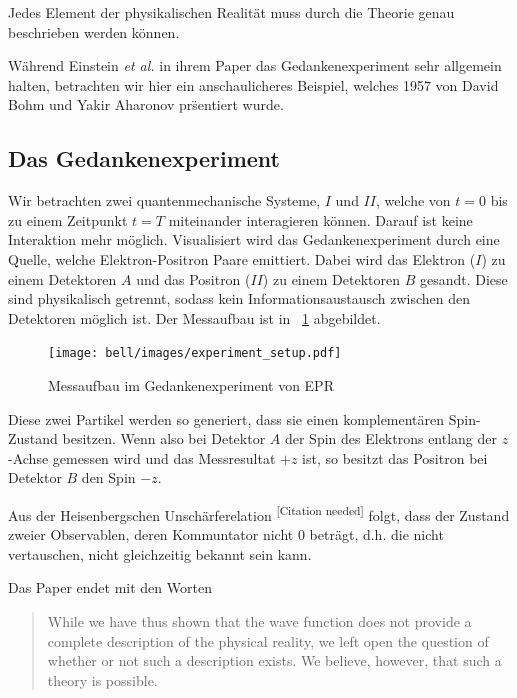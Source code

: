 \begin{refsection}
\begin{definition}\label{def:Bell:Vollstaendigkeit}
    Jedes Element der physikalischen Realit\"at muss durch die Theorie
    genau beschrieben werden k\"onnen.
\end{definition}

Während Einstein \emph{et al.} in ihrem Paper das Gedankenexperiment sehr
allgemein halten, betrachten wir hier ein anschaulicheres Beispiel, welches
1957 von David Bohm und Yakir Aharonov \cite{Bell:Bohm1957} pr\"sentiert wurde.

\subsection{Das Gedankenexperiment}
Wir betrachten zwei quantenmechanische Systeme, $I$ und $II$,
welche von $t=0$ bis zu einem Zeitpunkt $t=T$ miteinander 
interagieren k\"onnen. Darauf ist keine Interaktion mehr m\"oglich.
Visualisiert wird das Gedankenexperiment durch eine Quelle, welche
Elektron-Positron Paare emittiert. 
Dabei wird das Elektron ($I$) zu einem Detektoren $A$ und das 
Positron ($II$) zu einem Detektoren $B$ gesandt.
Diese sind physikalisch getrennt, sodass kein Informationsaustausch
zwischen den Detektoren m\"oglich ist.
Der Messaufbau ist in \figurename~\ref{fig:bell:EPR_Messaufbau} abgebildet.

\begin{figure}
    \centering
    \texttt{[image: bell/images/experiment\_setup.pdf]}
    \caption{Messaufbau im Gedankenexperiment von EPR}
    \label{fig:bell:EPR_Messaufbau}
\end{figure}

Diese zwei Partikel werden so generiert, dass sie einen komplement\"aren
Spin-Zustand besitzen. 
Wenn also bei Detektor $A$ der Spin des Elektrons entlang der $z$-Achse
gemessen wird und das Messresultat $+z$ ist, so besitzt das Positron bei
Detektor $B$ den Spin $-z$.

Aus der Heisenbergschen Unsch\"arferelation
\textsuperscript{[Citation needed]}
folgt, dass der Zustand zweier Observablen, deren Kommuntator
nicht $0$ betr\"agt, d.h. die nicht vertauschen, nicht gleichzeitig
bekannt sein kann.

Das Paper endet mit den Worten
\begin{quote}
    While we have thus shown that the wave function does not provide
    a complete description of the physical reality, we left open the
    question of whether or not such a description exists.
    We believe, however, that such a theory is possible.
\end{quote}


\end{refsection}
